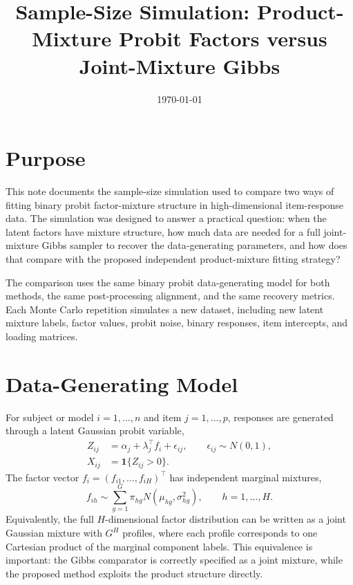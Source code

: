 \documentclass[11pt]{article}
\title{Sample-Size Simulation: Product-Mixture Probit Factors versus Joint-Mixture Gibbs}
\author{}
\date{\today}
\begin{document}
\maketitle

\section{Purpose}

This note documents the sample-size simulation used to compare two ways of fitting binary
probit factor-mixture structure in high-dimensional item-response data. The simulation was
designed to answer a practical question: when the latent factors have mixture structure, how
much data are needed for a full joint-mixture Gibbs sampler to recover the data-generating
parameters, and how does that compare with the proposed independent product-mixture fitting
strategy?

The comparison uses the same binary probit data-generating model for both methods, the same
post-processing alignment, and the same recovery metrics. Each Monte Carlo repetition simulates
a new dataset, including new latent mixture labels, factor values, probit noise, binary responses,
item intercepts, and loading matrices.

\section{Data-Generating Model}

For subject or model $i=1,\ldots,n$ and item $j=1,\ldots,p$, responses are generated through a
latent Gaussian probit variable,
\begin{align}
Z_{ij} &= \alpha_j + \lambda_j^\top f_i + \epsilon_{ij},
        \qquad \epsilon_{ij} \sim N(0,1), \\
X_{ij} &= \mathbf{1}\{Z_{ij} > 0\}.
\end{align}
The factor vector $f_i=(f_{i1},\ldots,f_{iH})^\top$ has independent marginal mixtures,
\begin{equation}
f_{ih} \sim \sum_{g=1}^G \pi_{hg} N(\mu_{hg}, \sigma_{hg}^2),
\qquad h=1,\ldots,H.
\end{equation}
Equivalently, the full $H$-dimensional factor distribution can be written as a joint Gaussian
mixture with $G^H$ profiles, where each profile corresponds to one Cartesian product of the
marginal component labels. This equivalence is important: the Gibbs comparator is correctly
specified as a joint mixture, while the proposed method exploits the product structure directly.
\end{document}

